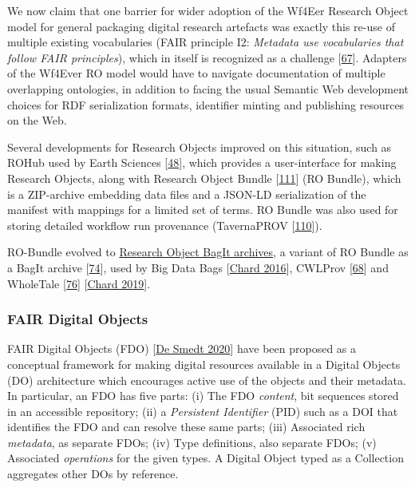 We now claim that one barrier for wider adoption of the Wf4Eer Research
Object model for general packaging digital research artefacts was
exactly this re-use of multiple existing vocabularies (FAIR principle
I2: \emph{Metadata use vocabularies that follow FAIR principles}), which
in itself is recognized as a challenge
{[}\href{https://doi.org/10.3233/978-1-61499-660-6-9}{67}{]}. Adapters
of the Wf4Ever RO model would have to navigate documentation of multiple
overlapping ontologies, in addition to facing the usual Semantic Web
development choices for RDF serialization formats, identifier minting
and publishing resources on the Web.

Several developments for Research Objects improved on this situation,
such as ROHub used by Earth Sciences
{[}\href{https://arxiv.org/abs/1809.10617}{48}{]}, which provides a
user-interface for making Research Objects, along with Research Object
Bundle {[}\href{https://w3id.org/bundle/2014-11-05/}{111}{]} (RO
Bundle), which is a ZIP-archive embedding data files and a JSON-LD
serialization of the manifest with mappings for a limited set of terms.
RO Bundle was also used for storing detailed workflow run provenance
(TavernaPROV
{[}\href{https://s11.no/2016/provweek-tavernaprov/}{110}{]}).

RO-Bundle evolved to \href{https://w3id.org/ro/bagit}{Research Object
BagIt archives}, a variant of RO Bundle as a BagIt archive
{[}\href{https://doi.org/10.17487/rfc8493}{74}{]}, used by Big Data Bags
{[}\href{https://www.research.manchester.ac.uk/portal/files/45989205/bagminid.pdf}{Chard 2016}{]},
CWLProv {[}\href{https://doi.org/10.1093/gigascience/giz095}{68}{]} and
WholeTale {[}\href{https://doi.org/10.3233/APC200107}{76}{]}
{[}\href{https://doi.org/10.1109/eScience.2019.00068}{Chard 2019}{]}.

\hypertarget{fair-digital-objects}{%
\subsubsection{FAIR Digital Objects}\label{fair-digital-objects}}

FAIR Digital Objects (FDO)
{[}\href{https://doi.org/10.3390/publications8020021}{De Smedt 2020}{]} have been
proposed as a conceptual framework for making digital resources
available in a Digital Objects (DO) architecture which encourages active
use of the objects and their metadata. In particular, an FDO has five
parts: (i) The FDO \emph{content}, bit sequences stored in an accessible
repository; (ii) a \emph{Persistent Identifier} (PID) such as a DOI that
identifies the FDO and can resolve these same parts; (iii) Associated
rich \emph{metadata}, as separate FDOs; (iv) Type definitions, also
separate FDOs; (v) Associated \emph{operations} for the given types. A
Digital Object typed as a Collection aggregates other DOs by reference.

